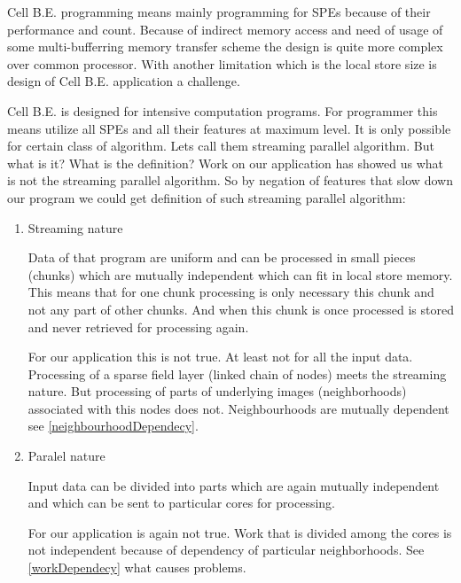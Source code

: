 \par
Cell B.E. programming means mainly programming for SPEs because of their performance and count.
Because of indirect memory access and need of usage of some multi-bufferring memory transfer scheme the design is quite more complex over common processor.
With another limitation which is the local store size is design of Cell B.E. application a challenge.

\par
Cell B.E. is designed for intensive computation programs.
For programmer this means utilize all SPEs and all their features at maximum level.
It is only possible for certain class of algorithm.
Lets call them streaming parallel algorithm.
But what is it? What is the definition?
Work on our application has showed us what is not the streaming parallel algorithm.
So by negation of features that slow down our program we could get definition of such streaming parallel algorithm:
\begin{enumerate}

\item{Streaming nature}
\par
Data of that program are uniform and can be processed in small pieces (chunks) which are mutually independent which can fit in local store memory.
This means that for one chunk processing is only necessary this chunk and not any part of other chunks.
And when this chunk is once processed is stored and never retrieved for processing again.

\par
For our application this is not true.
At least not for all the input data.
Processing of a sparse field layer (linked chain of nodes) meets the streaming nature.
But processing of parts of underlying images (neighborhoods) associated with this nodes does not.
Neighbourhoods are mutually dependent see \ref{neighbourhoodDependecy}.

\item{Paralel nature}
\par
Input data can be divided into parts which are again mutually independent and which can be sent to particular cores for processing.

\par
For our application is again not true.
Work that is divided among the cores is not independent because of dependency of particular neighborhoods.
See \ref{workDependecy} what causes problems.

\end{enumerate}


